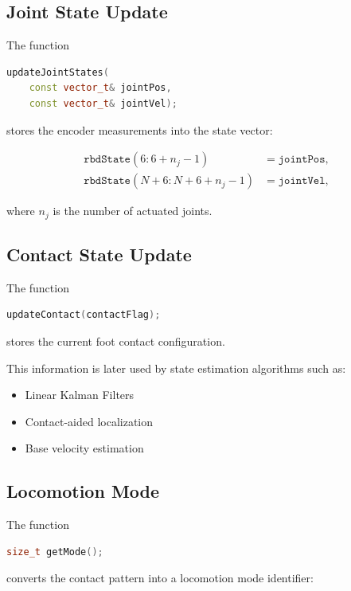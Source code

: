 \subsection{Joint State Update}

The function

\begin{lstlisting}[language=C++]
updateJointStates(
    const vector_t& jointPos,
    const vector_t& jointVel);
\end{lstlisting}

stores the encoder measurements into the state vector:

\begin{align}
\texttt{rbdState}(6 : 6+n_j-1)
    &= \texttt{jointPos}, \\
\texttt{rbdState}(N+6 : N+6+n_j-1)
    &= \texttt{jointVel},
\end{align}

where \(n_j\) is the number of actuated joints.

\subsection{Contact State Update}

The function

\begin{lstlisting}[language=C++]
updateContact(contactFlag);
\end{lstlisting}

stores the current foot contact configuration.

This information is later used by state estimation algorithms such as:

\begin{itemize}
    \item Linear Kalman Filters
    \item Contact-aided localization
    \item Base velocity estimation
\end{itemize}

\subsection{Locomotion Mode}

The function

\begin{lstlisting}[language=C++]
size_t getMode();
\end{lstlisting}

converts the contact pattern into a locomotion mode identifier:

